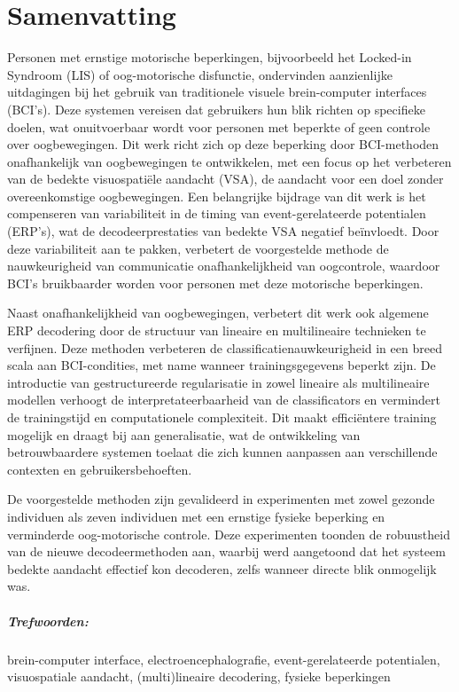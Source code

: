 \chapter*{Samenvatting}

Personen met ernstige motorische beperkingen, bijvoorbeeld het Locked-in
Syndroom (LIS) of oog-motorische disfunctie, ondervinden aanzienlijke
uitdagingen bij het gebruik van traditionele visuele brein-computer interfaces (BCI's).
Deze systemen vereisen dat gebruikers hun blik richten op specifieke doelen,
wat onuitvoerbaar wordt voor personen met beperkte of geen controle
over oogbewegingen.
Dit werk richt zich op deze beperking door BCI-methoden onafhankelijk van
oogbewegingen te ontwikkelen, met een focus op het verbeteren van de bedekte
visuospati\"ele aandacht (VSA), de  aandacht voor een doel zonder
overeenkomstige oogbewegingen.
Een belangrijke bijdrage van dit werk is het compenseren van variabiliteit in
de timing van event-gerelateerde potentialen (ERP's), wat de decodeerprestaties
van bedekte VSA negatief beïnvloedt.
Door deze variabiliteit aan te pakken, verbetert de voorgestelde methode de
nauwkeurigheid van communicatie onafhankelijkheid van oogcontrole,
waardoor BCI's bruikbaarder worden voor personen met deze motorische
beperkingen.

Naast onafhankelijkheid van oogbewegingen, verbetert dit werk ook algemene
ERP decodering door de structuur van lineaire en multilineaire technieken te verfijnen.
Deze methoden verbeteren de classificatienauwkeurigheid in een breed scala aan
BCI-condities, met name wanneer trainingsgegevens beperkt zijn.
De introductie van gestructureerde regularisatie in zowel lineaire als
multilineaire modellen verhoogt de interpretateerbaarheid van de classificators
en vermindert de trainingstijd en computationele complexiteit.
Dit maakt efficiëntere training mogelijk en draagt bij aan generalisatie, wat
de ontwikkeling van betrouwbaardere systemen toelaat die zich kunnen
aanpassen aan verschillende contexten en gebruikersbehoeften.

De voorgestelde methoden zijn gevalideerd in experimenten met zowel gezonde
individuen als zeven individuen met een ernstige fysieke beperking en verminderde
oog-motorische controle.
Deze experimenten toonden de robuustheid van de nieuwe decodeermethoden aan,
waarbij werd aangetoond dat het systeem bedekte aandacht effectief kon decoderen,
zelfs wanneer directe blik onmogelijk was.

\paragraph{Trefwoorden:}
brein-computer interface,
electroencephalografie,
event-gerelateerde potentialen,
visuospatiale aandacht,
(multi)lineaire decodering,
fysieke beperkingen
